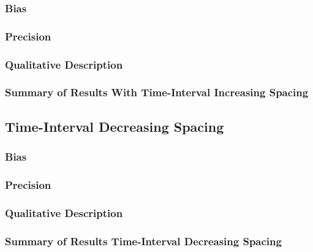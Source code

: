 \documentclass[
12pt, %
twoside,
english]{guelphthesis}
\begin{document}
\hypertarget{bias-time-inc-exp2}{%
\subsubsection{Bias}\label{bias-time-inc-exp2}}

\hypertarget{precision-time-inc-exp2}{%
\subsubsection{Precision}\label{precision-time-inc-exp2}}

\hypertarget{qualitative-time-inc-exp2}{%
\subsubsection{Qualitative Description}\label{qualitative-time-inc-exp2}}

\hypertarget{summary-of-results-with-time-interval-increasing-spacing-1}{%
\subsubsection{Summary of Results With Time-Interval Increasing Spacing}\label{summary-of-results-with-time-interval-increasing-spacing-1}}

\hypertarget{time-interval-decreasing-spacing-1}{%
\subsection{Time-Interval Decreasing Spacing}\label{time-interval-decreasing-spacing-1}}

\hypertarget{bias-time-dec-exp2}{%
\subsubsection{Bias}\label{bias-time-dec-exp2}}

\hypertarget{precision-time-dec-exp2}{%
\subsubsection{Precision}\label{precision-time-dec-exp2}}

\hypertarget{qualitative-time-dec-exp2}{%
\subsubsection{Qualitative Description}\label{qualitative-time-dec-exp2}}

\hypertarget{summary-of-results-time-interval-decreasing-spacing-1}{%
\subsubsection{Summary of Results Time-Interval Decreasing Spacing}\label{summary-of-results-time-interval-decreasing-spacing-1}}
\end{document}
